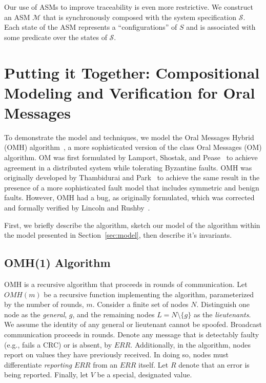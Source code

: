 \documentclass{llncs/llncs}
\newcommand{\lee}[1]{ } %
\newcommand{\lee}[1]{ {\color{blue}$<$lee: #1$>$} } %
\begin{document}
Our use of ASMs to improve traceability is even more restrictive. We construct an ASM $\mathcal{M}$ that is synchronously composed with the system specification $\mathcal{S}$. Each state of the ASM represents a ``configurations'' of $S$ and is associated with some predicate over the states of $\mathcal{S}$.

\lee{note that the ASM is not a refinement.}


\section{Putting it Together: Compositional Modeling and Verification for Oral Messages}\label{sec:byz}

To demonstrate the model and techniques, we model the Oral Messages Hybrid (OMH) algorithm~\cite{}, a more sophisticated version of the class Oral Messages (OM) algorithm. OM was first formulated by Lamport, Shostak, and Pease~\cite{om} to achieve agreement in a distributed system while tolerating Byzantine faults. OMH was originally developed by Thambidurai and Park~\cite{hybrid} to achieve the same result in the presence of a more sophisticated fault model that includes symmetric and benign faults. However, OMH had a bug, as originally formulated, which was corrected and formally verified by Lincoln and Rushby~\cite{csl-93-2}.

First, we briefly describe the algorithm, sketch our model of the algorithm within the model presented in Section~\ref{sec:model}, then describe it's invariants.

\subsection{OMH(1) Algorithm}
OMH is a recursive algorithm that proceeds in rounds of communication. Let $OMH(m)$ be a recursive function implementing the algorithm, parameterized by the number of rounds, $m$. Consider a finite set of nodes $N$. Distinguish one node as the \emph{general}, $g$, and the remaining nodes $L = N \setminus \{g\}$ as the \emph{lieutenants}. We assume the identity of any general or lieutenant cannot be spoofed. Broadcast communication proceeds in rounds. Denote any message that is detectably faulty (e.g., fails a CRC) or is absent, by $ERR$. Additionally, in the algorithm, nodes report on values they have previously received. In doing so, nodes must differentiate \emph{reporting} $ERR$ from an $ERR$ itself. Let $R$ denote that an error is being reported. Finally, let $V$ be a special, designated value.
\end{document}

